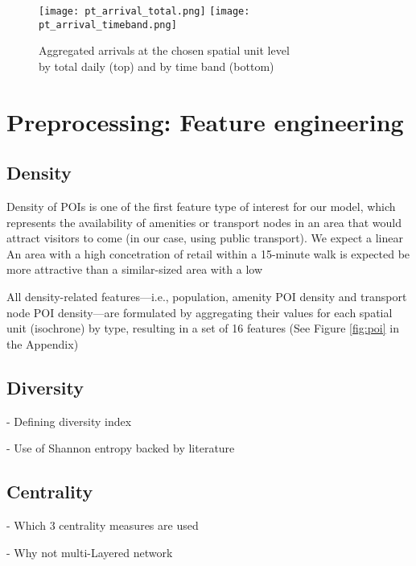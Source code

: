 \begin{figure}[!ht]
    \centering
    \texttt{[image: pt\_arrival\_total.png]}
    \centering
    \texttt{[image: pt\_arrival\_timeband.png]}
    \captionsetup{justification=centering}
    \caption{Aggregated arrivals at the chosen spatial unit level\\ by total daily (top) and by time band (bottom)}
    \label{fig:ptarrival}
\end{figure}


\pagebreak%
\section{Preprocessing: Feature engineering}
\subsection*{Density}

Density of POIs is one of the first feature type of interest for our model, which represents the availability of amenities or transport nodes in an area that would attract visitors to come (in our case, using public transport). We expect a linear An area with a high concetration of retail within a 15-minute walk is expected be more attractive than a similar-sized area with a low

All density-related features---i.e., population, amenity POI density and transport node POI density---are formulated by aggregating their values for each spatial unit (isochrone) by type, resulting in a set of 16 features (See Figure \ref{fig:poi} in the Appendix)

\subsection*{Diversity}
- Defining diversity index

- Use of Shannon entropy backed by literature




\subsection*{Centrality}
- Which 3 centrality measures are used




- Why not multi-Layered network


